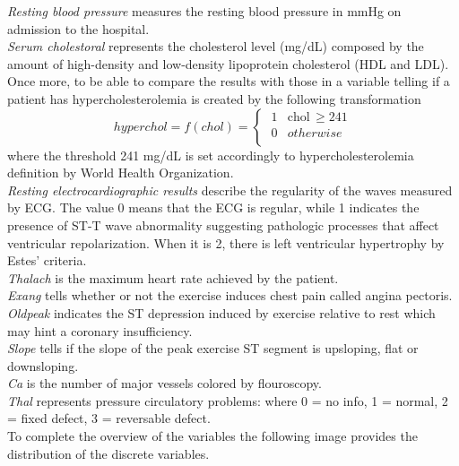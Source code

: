 \documentclass{article}
\begin{document}
\textit{Resting blood pressure} measures the resting blood pressure in mmHg on admission to the hospital. \\
\textit{Serum cholestoral} represents the cholesterol level (mg/dL) composed by the amount of high-density and low-density lipoprotein cholesterol (HDL and LDL). Once more, to be able to compare the results with those in \cite{Steno} a variable telling if a patient has hypercholesterolemia is created by the following transformation
\begin{equation}
   hyperchol =  f(chol) = \begin{cases}
                \; 1 & \text{chol} \, \geq 241 \\
                \; 0 & otherwise \\
                \end{cases}
\end{equation}
where the threshold 241 mg/dL is set accordingly to hypercholesterolemia definition by World Health Organization. \\
\textit{Resting electrocardiographic results} describe the regularity of the waves measured by ECG. The value 0 means that the ECG is regular, while 1 indicates the presence of ST-T wave abnormality suggesting pathologic processes that affect ventricular repolarization. When it is 2, there is  left ventricular hypertrophy by Estes' criteria. \\
\textit{Thalach} is the maximum heart rate achieved by the patient.\\
\textit{Exang} tells whether or not the exercise induces chest pain called angina pectoris. \\
\textit{Oldpeak} indicates the ST depression induced by exercise relative to rest which may hint a coronary insufficiency.\\
\textit{Slope} tells if the slope of the peak exercise ST segment is upsloping, flat or downsloping. \\
\textit{Ca} is  the number of major vessels colored by flouroscopy. \\
\textit{Thal} represents pressure circulatory  problems: where 0 = no info, 1 = normal, 2 = fixed defect, 3 = reversable defect.\\

To complete the overview of the variables the following image provides the distribution of the discrete variables.
\end{document}
